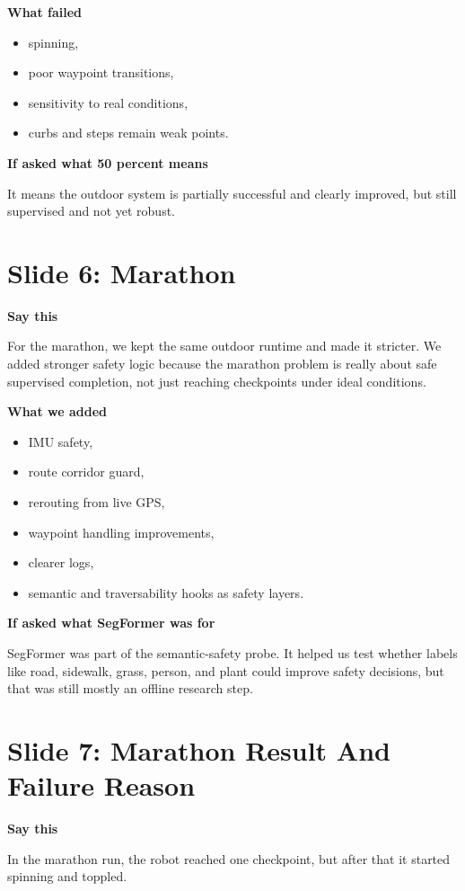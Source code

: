 \documentclass[11pt]{article}
\begin{document}
\textbf{What failed}
\begin{itemize}[leftmargin=*]
\item spinning,
\item poor waypoint transitions,
\item sensitivity to real conditions,
\item curbs and steps remain weak points.
\end{itemize}

\textbf{If asked what 50 percent means}

It means the outdoor system is partially successful and clearly improved, but still supervised and not yet robust.

\section*{Slide 6: Marathon}
\textbf{Say this}

For the marathon, we kept the same outdoor runtime and made it stricter. We added stronger safety logic because the marathon problem is really about safe supervised completion, not just reaching checkpoints under ideal conditions.

\textbf{What we added}
\begin{itemize}[leftmargin=*]
\item IMU safety,
\item route corridor guard,
\item rerouting from live GPS,
\item waypoint handling improvements,
\item clearer logs,
\item semantic and traversability hooks as safety layers.
\end{itemize}

\textbf{If asked what SegFormer was for}

SegFormer was part of the semantic-safety probe. It helped us test whether labels like road, sidewalk, grass, person, and plant could improve safety decisions, but that was still mostly an offline research step.

\section*{Slide 7: Marathon Result And Failure Reason}
\textbf{Say this}

In the marathon run, the robot reached one checkpoint, but after that it started spinning and toppled.
\end{document}

